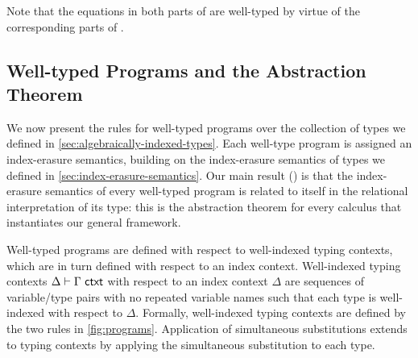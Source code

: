 Note that the equations in both parts of
 are well-typed by virtue of the
corresponding parts of .

\subsection{Well-typed Programs and the Abstraction Theorem}
\label{sec:well-typed-programs}

We now present the rules for well-typed programs over the collection
of types we defined in \autoref{sec:algebraically-indexed-types}. Each
well-type program is assigned an index-erasure semantics, building on
the index-erasure semantics of types we defined in
\autoref{sec:index-erasure-semantics}. Our main result
() is that the index-erasure semantics of
every well-typed program is related to itself in the relational
interpretation of its type: this is the abstraction theorem for every
calculus that instantiates our general framework.

Well-typed programs are defined with respect to well-indexed typing
contexts, which are in turn defined with respect to an index
context. Well-indexed typing contexts $\Delta \vdash \Gamma \textsf{ ctxt}$
with respect to an index context $\Delta$ are sequences of
variable/type pairs with no repeated variable names such that each
type is well-indexed with respect to $\Delta$. Formally, well-indexed
typing contexts are defined by the two rules in
\autoref{fig:programs}.  Application of simultaneous substitutions
extends to typing contexts by applying the simultaneous substitution
to each type.

